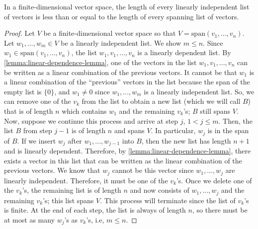 \documentclass{article}
\begin{document}
\begin{theorem}
  \label{thm:length-not-exceed-spanning}
  In a finite-dimensional vector space, the length of every linearly
  independent list of vectors is less than or equal to the length of
  every spanning list of vectors.
\end{theorem}
\begin{proof}
  Let $V$ be a finite-dimensional vector space so that $V =
  \text{span}(v_1, ..., v_n)$. Let $w_1, ..., w_m \in V$ be a linearly
  independent list. We show $m \le n$. Since $w_1 \in \text{span}(v_1,
  ..., v_n)$, the list $w_1, v_1, ..., v_n$ is a linearly dependent
  list. By \cref{lemma:linear-dependence-lemma}, one of the vectors in
  the list $w_1, v_1, ..., v_n$ can be written as a linear combination
  of the previous vectors. It cannot be that $w_1$ is a linear
  combination of the ``previous'' vectors in the list because the span
  of the empty list is $\{0\}$, and $w_1 \ne 0$ since $w_1,
  ..., w_m$ is a linearly independent list. So, we can remove one of
  the $v_k$ from the list to obtain a new list (which we will call
  $B$) that is of length $n$ which contains $w_1$ and the
  remaining $v_k$'s; $B$ still spans $V$. Now, suppose we continue this process and
  arrive at step $j$, $1 < j \le m$. Then, the list $B$ from step $j -
  1$ is of length $n$ and spans $V$. In particular, $w_j$ is in the
  span of $B$. If we insert $w_j$ after $w_1, ..., w_{j-1}$ into $B$,
  then the new list has length $n + 1$ and is linearly
  dependent. Therefore, by \cref{lemma:linear-dependence-lemma}, there
  exists a vector in this list that can be written as the linear
  combination of the previous vectors. We know that $w_j$ cannot be
  this vector since $w_1, ..., w_j$ are linearly
  independent. Therefore, it must be one of the $v_k$'s. Once we
  delete one of the $v_k$'s, the remaining list is of length $n$ and
  now consists of $w_1, ..., w_j$ and the remaining $v_k$'s; this list
  spans $V$. This process will terminate since the list of $v_k$'s is
  finite. At the end of each step, the list is always of length $n$,
  so there must be at most as many $w_j$'s as $v_k$'s, i.e, $m \le n$.
\end{proof}
\end{document}
